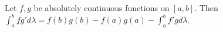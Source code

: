 Let $f, g$ be absolutely continuous functions on $[a, b]$. Then $\int_a^b f g' d\lambda = f(b)g(b) - f(a)g(a) - \int_a^b f' g d\lambda$.
